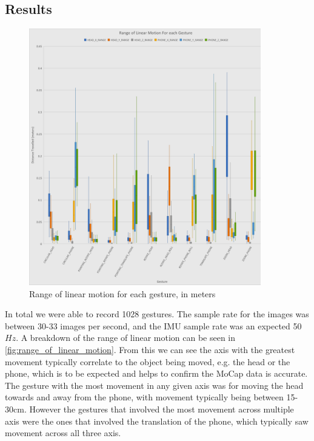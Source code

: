 \subsection{Results}
\begin{figure}
    \centering
    \includegraphics[width=0.9\textwidth]{figures/RangeOfLinearMotion.png}
    \caption{\label{fig:range_of_linear_motion} Range of linear motion for each gesture, in meters}
\end{figure}
In total we were able to record 1028 gestures. The sample rate for the images was between 30-33 images per second, and the IMU sample rate was an expected 50$Hz$.
A breakdown of the range of linear motion can be seen in \autoref{fig:range_of_linear_motion}.
From this we can see the axis with the greatest movement typically correlate to the object being moved, e.g. the head or the phone, which is to be expected and helps to confirm the MoCap data is accurate.
The gesture with the most movement in any given axis was for moving the head towards and away from the phone, with movement typically being between 15-30cm. However the gestures that involved the most movement across multiple axis were the ones that involved the translation of the phone, which typically saw movement across all three axis.

